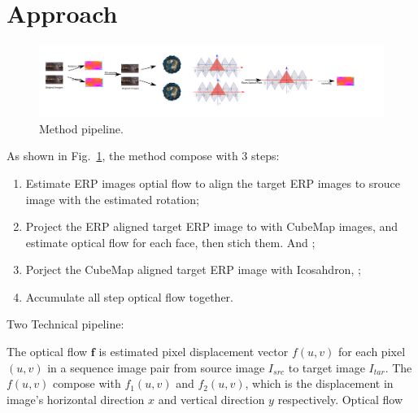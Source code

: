 \section{Approach}\label{sec:approach}

\begin{figure}[hbt!]
	\centering
	\includegraphics[width=0.95\linewidth]{images/method_pipeline_0.pdf}
	\caption{Method pipeline. }
	\label{fig:approach:pipeline}
\end{figure}







As shown in Fig.~\ref{fig:approach:pipeline}, the method compose with 3 steps:

\begin{enumerate}
	\item Estimate ERP images optial flow to align the target ERP images to srouce image with the estimated rotation;
	\item Project the ERP aligned target ERP image to with CubeMap images, and estimate optical flow for each face, then stich them. And ;
	\item Porject the CubeMap aligned target ERP image with Icosahdron, ;
	\item Accumulate all step optical flow together.
\end{enumerate}



Two Technical pipeline:


The optical flow $\textbf{f}$ is estimated pixel displacement vector $f(u,v)$ for each pixel $(u,v)$ in a sequence image pair from source image $I_{src}$ to target image $I_{tar}$.
The $f(u,v)$ compose with $f_1(u,v)$ and $f_2(u,v)$, which is the displacement in image's horizontal direction $x$ and vertical direction $y$ respectively.
Optical flow 

